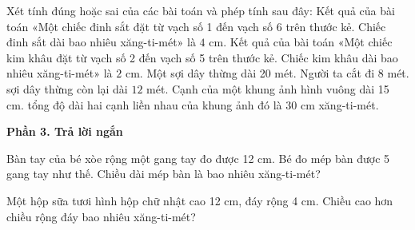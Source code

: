 \begin{ex} %
Xét tính đúng hoặc sai của các bài toán và phép tính sau đây:
\choiceTF
{Kết quả của bài toán «Một chiếc đinh sắt đặt từ vạch số 1 đến vạch số 6 trên thước kẻ. Chiếc đinh sắt dài bao nhiêu xăng-ti-mét» là $4\text{ cm}$.}
{Kết quả của bài toán «Một chiếc kim khâu đặt từ vạch số 2 đến vạch số 5 trên thước kẻ. Chiếc kim khâu dài bao nhiêu xăng-ti-mét» là $2\text{ cm}$.}
{\True Một sợi dây thừng dài 20 mét. Người ta cắt đi 8 mét. sợi dây thừng còn lại dài $12$ mét.}
{\True Cạnh của một khung ảnh hình vuông dài 15 cm. tổng độ dài hai cạnh liền nhau của khung ảnh đó là $30\text{ cm}$ xăng-ti-mét.}
\end{ex}

\textbf{Phần 3. Trả lời ngắn}

\begin{ex} %
Bàn tay của bé xòe rộng một gang tay đo được 12 cm. Bé đo mép bàn được 5 gang tay như thế. Chiều dài mép bàn là bao nhiêu xăng-ti-mét?
\end{ex}

\begin{ex} %
Một hộp sữa tươi hình hộp chữ nhật cao 12 cm, đáy rộng 4 cm. Chiều cao hơn chiều rộng đáy bao nhiêu xăng-ti-mét?
\end{ex}

